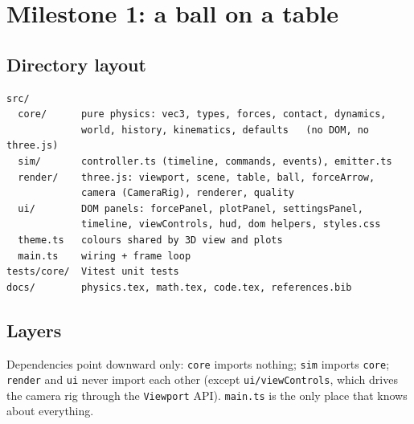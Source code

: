 \documentclass[11pt]{article}
\begin{document}
\section{Milestone 1: a ball on a table}

\subsection{Directory layout}
\begin{lstlisting}
src/
  core/      pure physics: vec3, types, forces, contact, dynamics,
             world, history, kinematics, defaults   (no DOM, no three.js)
  sim/       controller.ts (timeline, commands, events), emitter.ts
  render/    three.js: viewport, scene, table, ball, forceArrow,
             camera (CameraRig), renderer, quality
  ui/        DOM panels: forcePanel, plotPanel, settingsPanel,
             timeline, viewControls, hud, dom helpers, styles.css
  theme.ts   colours shared by 3D view and plots
  main.ts    wiring + frame loop
tests/core/  Vitest unit tests
docs/        physics.tex, math.tex, code.tex, references.bib
\end{lstlisting}

\subsection{Layers}
\begin{center}
\end{center}
Dependencies point downward only: \texttt{core} imports nothing; \texttt{sim} imports \texttt{core};
\texttt{render} and \texttt{ui} never import each other (except \texttt{ui/viewControls}, which drives the
camera rig through the \texttt{Viewport} API). \texttt{main.ts} is the only place that knows about everything.
\end{document}
